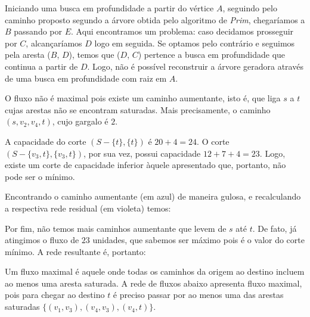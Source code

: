 \documentclass{homework}
\begin{document}
	
	
	
	Iniciando uma busca em profundidade a partir do vértice $A$, seguindo pelo caminho proposto segundo a árvore obtida pelo algoritmo de \textit{Prim}, chegaríamos a $B$ passando por $E$. Aqui encontramos um problema: caso decidamos prosseguir por $C$, alcançaríamos $D$ logo em seguida. Se optamos pelo contrário e seguimos pela aresta ($B$, $D$), temos que ($D$, $C$) pertence a busca em profundidade que continua a partir de $D$. Logo, não é possível reconstruir a árvore geradora através de uma busca em profundidade com raiz em $A$.

	\quest
	
	\begin{fig}%
		
	\end{fig}%

	\subquest O fluxo não é maximal pois existe um caminho aumentante, isto é, que liga $s$ a $t$ cujas arestas não se encontram saturadas. Mais precisamente, o caminho $(s, v_2, v_4, t)$, cujo gargalo é $2$.	
	
	\subquest A capacidade do corte $(S - \{t\}, \{t\})$ é $20 + 4 = 24$. O corte $(S - \{v_3, t\}, \{v_3, t\})$, por sua vez, possui capacidade $12 + 7 + 4 = 23$. Logo, existe um corte de capacidade inferior àquele apresentado que, portanto, não pode ser o mínimo.
	
	\subquest Encontrando o caminho aumentante (em {\color{blue!70} azul}) de maneira gulosa, e recalculando a respectiva rede residual (em {\color{violet!70} violeta}) temos:
	
		
	
	Por fim, não temos mais caminhos aumentante que levem de $s$ até $t$. De fato, já atingimos o fluxo de $23$ unidades, que sabemos ser máximo pois é o valor do corte mínimo. A rede resultante é, portanto:
	
		
	
	\subquest Um fluxo maximal é aquele onde todas os caminhos da origem ao destino incluem ao menos uma aresta saturada. A rede de fluxos abaixo apresenta fluxo maximal, pois para chegar ao destino $t$ é preciso passar por ao menos uma das arestas saturadas $\{(v_1, v_3), (v_4, v_3), (v_4, t)\}$.
	
\end{document}
